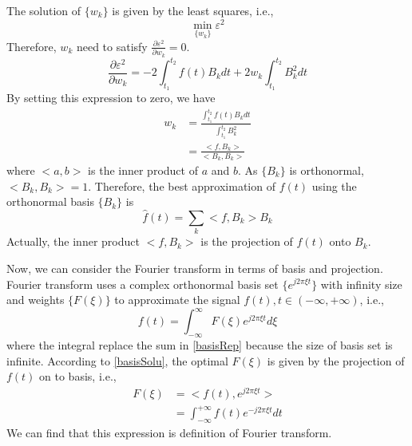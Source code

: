 \documentclass[10pt]{article}
\begin{document}
The solution of $\{w_k\}$ is given by the least squares, i.e.,
\begin{equation}
	\min_{\{w_k\}} \varepsilon^2
\end{equation}
Therefore, $w_k$ need to satisfy $\frac{\partial \varepsilon^2}{\partial w_k}=0$.
\begin{equation}
	\frac{\partial \varepsilon^2}{\partial w_k} = -2 \int_{t_1}^{t_2} f(t) B_k dt + 2 w_k \int_{t_1}^{t_2} B_k^2 dt
\end{equation}
By setting this expression to zero, we have
\begin{align}
	w_k & = \frac{ \int_{t_1}^{t_2} f(t) B_k dt }{ \int_{t_1}^{t_2} B_k^2 } \nonumber\\
	& = \frac{ <f, B_k> }{ <B_k, B_k> }
\end{align}
where $<a,b>$ is the inner product of $a$ and $b$. As $\{B_k\}$ is orthonormal, 
$<B_k, B_k> = 1$. Therefore, the best approximation of $f(t)$ using the orthonormal 
basis $\{B_k\}$ is 
\begin{equation}
	\hat{f}(t) = \sum_k <f,B_k> B_k \label{basisSolu}
\end{equation}
Actually, the inner product $<f, B_k>$ is the projection of $f(t)$ onto $B_k$.

Now, we can consider the Fourier transform in terms of basis and projection.
Fourier transform uses a complex orthonormal basis set $\{ e^{j 2\pi \xi t } \}$ with infinity size 
and  weights $\{ F(\xi) \}$ to approximate the signal $f(t), t \in (-\infty, +\infty)$, i.e.,
\begin{equation}
	f(t) = \int_{-\infty}^{\infty} F(\xi) e^{j2\pi \xi t } d\xi
\end{equation}
where the integral replace the sum in \eqref{basisRep} because the size of basis set is infinite.
According to \eqref{basisSolu}, the optimal $F(\xi)$ is given by the projection 
of $f(t)$ on to basis, i.e.,
\begin{align}
	F(\xi) & = <f(t), e^{j2\pi \xi t }> \nonumber \\
	& = \int_{-\infty}^{+\infty} f(t) e^{-j2\pi \xi t} dt
\end{align}
We can find that this expression is definition of Fourier transform.
\end{document}
